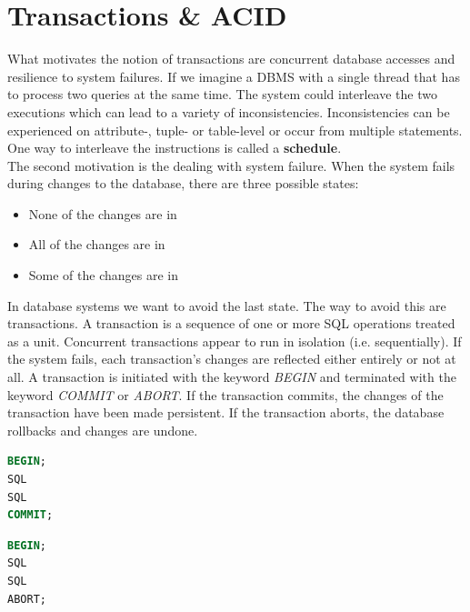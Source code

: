 \section{Transactions \& ACID}
What motivates the notion of transactions are concurrent database accesses and resilience to system failures. If we imagine a DBMS with a single thread that has to process two queries at the same time. The system could interleave the two executions which can lead to a variety of inconsistencies. Inconsistencies can be experienced on attribute-, tuple- or table-level or occur from multiple statements.
One way to interleave the instructions is called a \textbf{schedule}.\\
The second motivation is the dealing with system failure. When the system fails during changes to the database, there are three possible states:
\begin{itemize}
\item None of the changes are in
\item All of the changes are in
\item Some of the changes are in
\end{itemize}
In database systems we want to avoid the last state. The way to avoid this are transactions. A transaction is a sequence of one or more SQL operations treated as a unit. Concurrent transactions appear to run in isolation (i.e. sequentially). If the system fails, each transaction's changes are reflected either entirely or not at all. A transaction is initiated with the keyword \textit{BEGIN} and terminated with the keyword \textit{COMMIT} or \textit{ABORT}. If the transaction commits, the changes of the transaction have been made persistent. If the transaction aborts, the database rollbacks and changes are undone.\\
\begin{minipage}{.48\textwidth}
\begin{lstlisting}[language=SQL]
BEGIN;
SQL
SQL
COMMIT;
\end{lstlisting}
\end{minipage}
\begin{minipage}{.04\textwidth}
\hfill
\end{minipage}
\begin{minipage}{.48\textwidth}
\begin{lstlisting}[language=SQL]
BEGIN;
SQL
SQL
ABORT;
\end{lstlisting}
\end{minipage}

